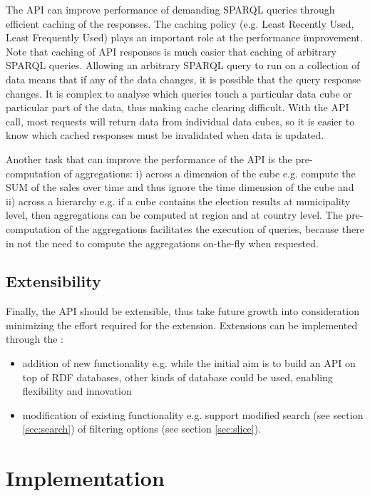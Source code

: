 \documentclass{llncs}
\begin{document}
The API can improve performance of demanding SPARQL queries through efficient caching of the responses. The caching policy (e.g. Least Recently Used, Least Frequently Used) plays an important role at the performance improvement. Note that caching of API responses is much easier that caching of arbitrary SPARQL queries. Allowing an arbitrary SPARQL query to run on a collection of data means that if any of the data changes, it is possible that the query response changes.  It is complex to analyse which queries touch a particular data cube or particular part of the data, thus making cache clearing difficult.  With the API call, most requests will return data from individual data cubes, so it is easier to know which cached responses must be invalidated when data is updated.

Another task that can improve the performance of the API is the pre-computation of aggregations: i) across a dimension of the cube e.g. compute the SUM of the sales over time and thus ignore the time dimension of the cube and ii) across a hierarchy e.g. if a cube contains the election results at municipality level, then aggregations can be computed at region and at country level. The pre-computation of the aggregations facilitates the execution of queries, because there in not the need to compute the aggregations on-the-fly when requested. 


\subsection{Extensibility}

Finally, the API should be extensible, thus take future growth into consideration minimizing the effort required for the extension. Extensions can be implemented through the :
\begin{itemize}
\item addition of new functionality e.g. while the initial aim is to build an API on top of RDF databases, other kinds of database could be used, enabling flexibility and innovation
\item modification of existing functionality e.g. support modified search (see section \ref{sec:search}) of filtering options (see section \ref{sec:slice}).
\end{itemize} 


\section{Implementation}\label{sec:impl}
\end{document}
